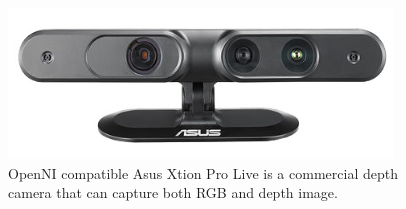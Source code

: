 \begin{figure}
	[h] \centering 
	\includegraphics[height=4cm]{figures/content/xtion.jpg} \caption{OpenNI compatible Asus Xtion Pro Live is a commercial depth camera that can capture both RGB and depth image. \cite{asus-spec} } \label{fg:xtion} 
\end{figure}
